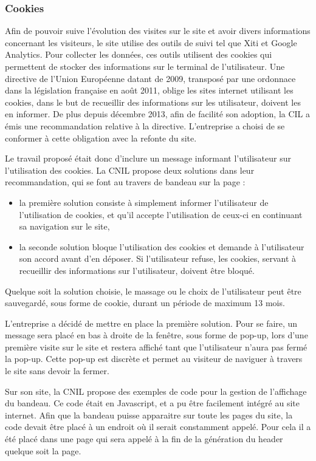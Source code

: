\documentclass[12pt,a4paper]{article}
\begin{document}
\subsubsection{Cookies}
Afin de pouvoir suive l'évolution des visites sur le site et avoir divers informations concernant les visiteurs, le site utilise des outils de suivi tel que Xiti et Google Analytics. Pour collecter les données, ces outils utilisent des cookies qui permettent de stocker des informations sur le terminal de l'utilisateur. Une directive de l'Union Européenne datant de 2009, transposé par une ordonnace dans la législation française en août 2011, oblige les sites internet utilisant les cookies, dans le but de recueillir des informations sur les utilisateur, doivent les en informer. De plus depuis décembre 2013, afin de facilité son adoption, la CIL a émis une recommandation relative à la directive. L'entreprise a choisi de se conformer à cette obligation avec la refonte du site.\par 
Le travail proposé était donc d'inclure un message informant l'utilisateur sur l'utilisation des cookies. La CNIL propose deux solutions dans leur recommandation, qui se font au travers de bandeau sur la page :
\begin{itemize}
\item la première solution consiste à simplement informer l'utilisateur de l'utilisation de cookies, et qu'il accepte l'utilisation de ceux-ci en continuant sa navigation sur le site,
\item la seconde solution bloque l'utilisation des cookies et demande à l'utilisateur son accord avant d'en déposer. Si l'utilisateur refuse, les cookies, servant à recueillir des informations sur l'utilisateur, doivent être bloqué.
\end{itemize}\par 
Quelque soit la solution choisie, le massage ou le choix de l'utilisateur peut être sauvegardé, sous forme de cookie, durant un période de maximum 13 mois.\par 
L'entreprise a décidé de mettre en place la première solution. Pour se faire, un message sera placé en bas à droite de la fenêtre, sous forme de pop-up, lors d'une première visite sur le site et restera affiché tant que l'utilisateur n'aura pas fermé la pop-up. Cette pop-up est discrète et permet au visiteur de naviguer à travers le site sans devoir la fermer.\par 
Sur son site, la CNIL propose des exemples de code pour la gestion de l'affichage du bandeau. Ce code était en Javascript, et a pu être facilement intégré au site internet. Afin que la bandeau puisse apparaitre sur toute les pages du site, la code devait être placé à un endroit où il serait constamment appelé. Pour cela il a été placé dans une page qui sera appelé à la fin de la génération du header quelque soit la page.
\end{document}
